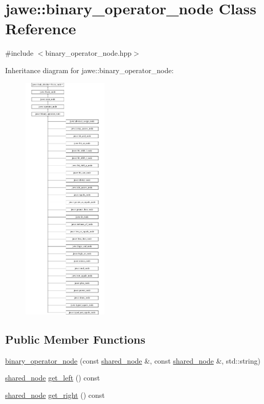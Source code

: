 \hypertarget{classjawe_1_1binary__operator__node}{}\section{jawe\+:\+:binary\+\_\+operator\+\_\+node Class Reference}
\label{classjawe_1_1binary__operator__node}


{\ttfamily \#include $<$binary\+\_\+operator\+\_\+node.\+hpp$>$}

Inheritance diagram for jawe\+:\+:binary\+\_\+operator\+\_\+node\+:\begin{figure}[H]
\begin{center}
\leavevmode
\includegraphics[height=12.000000cm]{classjawe_1_1binary__operator__node}
\end{center}
\end{figure}
\subsection*{Public Member Functions}
\begin{DoxyCompactItemize}
\item 
\hyperlink{classjawe_1_1binary__operator__node_a38237c97b9f17f6ba32b7e18c4795a99}{binary\+\_\+operator\+\_\+node} (const \hyperlink{namespacejawe_a3f307481d921b6cbb50cc8511fc2b544}{shared\+\_\+node} \&, const \hyperlink{namespacejawe_a3f307481d921b6cbb50cc8511fc2b544}{shared\+\_\+node} \&, std\+::string)
\item 
\hyperlink{namespacejawe_a3f307481d921b6cbb50cc8511fc2b544}{shared\+\_\+node} \hyperlink{classjawe_1_1binary__operator__node_a573ef1c5736807a686ae25dcd9e0d241}{get\+\_\+left} () const
\item 
\hyperlink{namespacejawe_a3f307481d921b6cbb50cc8511fc2b544}{shared\+\_\+node} \hyperlink{classjawe_1_1binary__operator__node_a1294c8994976f2411d1382a240136104}{get\+\_\+right} () const
\end{DoxyCompactItemize}
